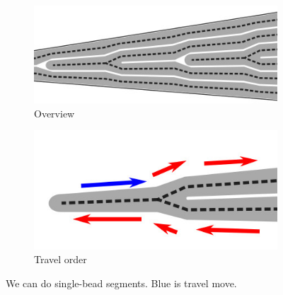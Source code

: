 \begin{figure}
\begin{subfigure}{0.45\columnwidth}
\includegraphics[width=\columnwidth]{sources/method/single_bead_strategy.jpg}
\caption{Overview}
\label{single_bead_strategy_overview}
\end{subfigure}
\begin{subfigure}{0.45\columnwidth}
\includegraphics[width=\columnwidth]{sources/method/single_bead_strategy_order.jpg}
\caption{Travel order}
\end{subfigure}
\caption{We can do single-bead segments. Blue is travel move.}
\label{single_bead_strategy}
\end{figure}


